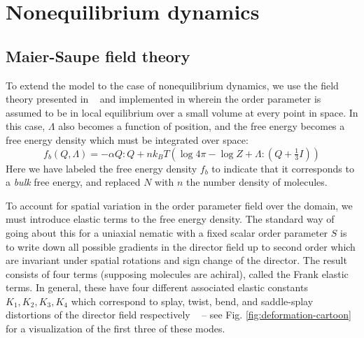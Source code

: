 \documentclass[reqno]{article}
\begin{document}
  \section{Nonequilibrium dynamics} \label{nonequilibrium-dynamics}

  \subsection{Maier-Saupe field theory}
  To extend the model to the case of nonequilibrium dynamics, we use the field
  theory presented in ~\cite{ball_nematic_2010} and implemented in
  \cite{schimming_computational_2020} wherein the order parameter is assumed to
  be in local equilibrium over a small volume at every point in space.
  In this case, $\Lambda$ also becomes a function of position, and the free
  energy becomes a free energy density which must be integrated over space:
  \begin{equation}
    f_b (Q, \Lambda)
    =
    -\alpha Q : Q
    + n k_B T \left(\log 4 \pi - \log Z + \Lambda : \left(Q + \tfrac13 I \right) \right)
  \end{equation}
  Here we have labeled the free energy density $f_b$ to indicate that it corresponds
  to a \textit{bulk} free energy, and replaced $N$ with $n$ the number density of molecules.
  
  To account for spatial variation in the order parameter field over the domain,
  we must introduce elastic terms to the free energy density.
  The standard way of going about this for a uniaxial nematic with a fixed
  scalar order parameter $S$ is to write down all possible gradients in the
  director field up to second order which are invariant under spatial rotations
  and sign change of the director.
  The result consists of four terms (supposing molecules are achiral), called
  the Frank elastic terms.
  In general, these have four different associated elastic constants $K_1, K_2,
  K_3, K_4$ which correspond to splay, twist, bend, and saddle-splay distortions of the
  director field respectively ~\cite{selinger_introduction_2016}
  -- see Fig. \ref{fig:deformation-cartoon} for a visualization of the first
  three of these modes.
  
\end{document}
